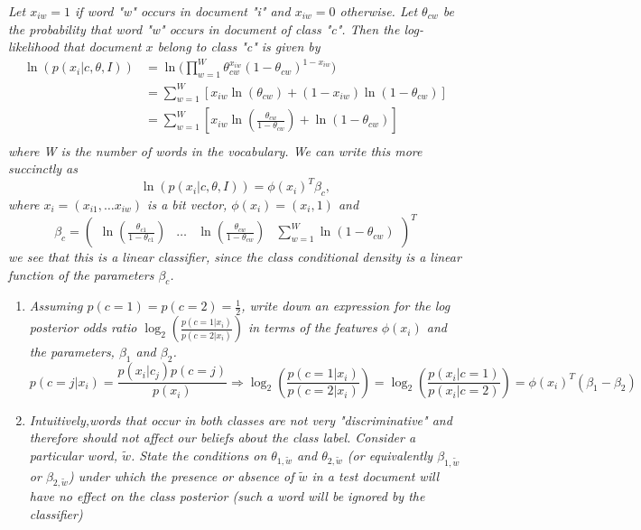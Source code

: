 \begin{example}
	\emph{Let $x_{iw}=1$ if word "w" occurs in document "i" and $x_{iw}=0$ otherwise. Let $\theta_{cw}$ be the probability that word "w" occurs in document of class "c". Then the log-likelihood that document $x$ belong to class "c" is given by}
	\begin{equation}
		\begin{split}
			\ln(p(x_i|c,\theta,I))&=\ln\bigg(\prod_{w=1}^{W}\theta_{cw}^{x_{iw}}(1-\theta_{cw})^{1-x_{iw}}\bigg)\\
			&= \sum_{w=1}^{W}[x_{iw}\ln(\theta_{cw})+(1-x_{iw})\ln(1-\theta_{cw})]\\
			&= \sum_{w=1}^{W}[x_{iw}\ln(\frac{\theta_{cw}}{1-\theta_{cw}})+\ln(1-\theta_{cw})]\\
		\end{split}
	\end{equation}
	\emph{where W is the number of words in the vocabulary. We can write this more succinctly as}
	\begin{equation}
		\ln(p(x_i|c,\theta,I))=\phi(x_i)^T\beta_c,
	\end{equation}
	\emph{where $x_i = (x_{i1},\dots x_{iw})$ is a bit vector, $\phi(x_i)=(x_i, 1)$ and}
	\begin{equation}
		\beta_c = \begin{pmatrix}
			\ln(\frac{\theta_{c1}}{1-\theta_{c1}}) & \dots & \ln(\frac{\theta_{cw}}{1-\theta_{cw}}) & \sum_{w=1}^{W} \ln(1-\theta_{cw})
		\end{pmatrix}^T
	\end{equation}
	\emph{we see that this is a linear classifier, since the class conditional density is a linear function of the parameters $\beta_c$.}
	\begin{enumerate}
		\item \emph{Assuming $p(c=1)=p(c=2)=\frac{1}{2}$, write down an expression for the log posterior odds ratio $\log_2(\frac{p(c=1|x_i)}{p(c=2|x_i)})$ in terms  of the features $\phi(x_i)$ and the parameters, $\beta_1$ and $\beta_2$.}
		\begin{equation}
			p(c=j|x_i) = \frac{p(x_i|c_j)p(c=j)}{p(x_i)}\Rightarrow \log_2(\frac{p(c=1|x_i)}{p(c=2|x_i)}) = \log_2(\frac{p(x_i|c=1)}{p(x_i|c=2)}) = \phi(x_i)^T(\beta_1-\beta_2)
		\end{equation}
		
		\item \emph{Intuitively,words that occur in both classes are not very "discriminative" and therefore should not affect our beliefs about the class label. Consider a particular word, $\tilde{w}$. State the conditions on $\theta_{1,\tilde{w}}$ and $\theta_{2,\tilde{w}}$ (or equivalently $\beta_{1,\tilde{w}}$ or $\beta_{2,\tilde{w}}$) under which the presence or absence of $\tilde{w}$ in a test document will have no effect on the class posterior (such a word will be ignored by the classifier)}\newline
		

\end{enumerate}
\end{example}
